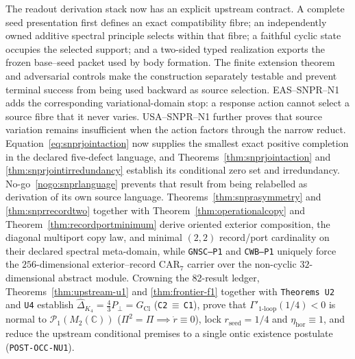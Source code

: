 \documentclass[11pt,a4paper]{article}
\theoremstyle{remark}
\begin{document}
The readout derivation stack now has an explicit upstream contract.  A
complete seed presentation first defines an exact compatibility fibre; an
independently owned additive spectral principle selects within that fibre; a
faithful cyclic state occupies the selected support; and a two-sided typed
realization exports the frozen base--seed packet used by body formation.  The
finite extension theorem and adversarial controls make the construction
separately testable and prevent terminal success from being used backward as
source selection.  EAS--SNPR--N1 adds the corresponding variational-domain
stop: a response action cannot select a source fibre that it never varies.
USA--SNPR--N1 further proves that source variation remains insufficient when
the action factors through the narrow reduct.  Equation~\eqref{eq:snprjointaction}
now supplies the smallest exact positive completion in the declared
five-defect language, and Theorems~\ref{thm:snprjointaction} and
\ref{thm:snprjointirredundancy} establish its conditional zero set and
irredundancy.  No-go~\ref{nogo:snprlanguage} prevents that result from being
relabelled as derivation of its own source language.  Theorems~\ref{thm:snprasymmetry} and
\ref{thm:snprrecordtwo} together with Theorem~\ref{thm:operationalcopy} and
Theorem~\ref{thm:recordportminimum} derive oriented exterior composition, the
diagonal multiport copy law, and minimal $(2,2)$ record/port cardinality on
their declared spectral meta-domain, while \texttt{GNSC--P1} and \texttt{CWB--P1}
uniquely force the $256$-dimensional exterior--record $\mathrm{CAR}_7$ carrier
over the non-cyclic $32$-dimensional abstract module.  Crowning the 82-result
ledger, Theorems~\ref{thm:upstream-u1} and \ref{thm:frontier-f1} together with
\texttt{Theorems U2} and \texttt{U4} establish $\widehat{\Delta}_{K_4}=\frac{4}{3}P_\perp=G_{\mathrm{Cl}}$
(\texttt{C2}\,$\equiv$\,\texttt{C1}), prove that $\Gamma'_{1\text{-loop}}(1/4)<0$
is normal to $\mathcal{P}_1(M_2(\mathbb{C}))$ ($\Pi^2=\Pi\implies\dot{r}\equiv 0$),
lock $r_{\mathrm{seed}}=1/4$ and $\eta_{\mathrm{hor}}\equiv 1$, and reduce the
upstream conditional premises to a single ontic existence postulate
(\texttt{POST-OCC-NU1}).
\end{document}

